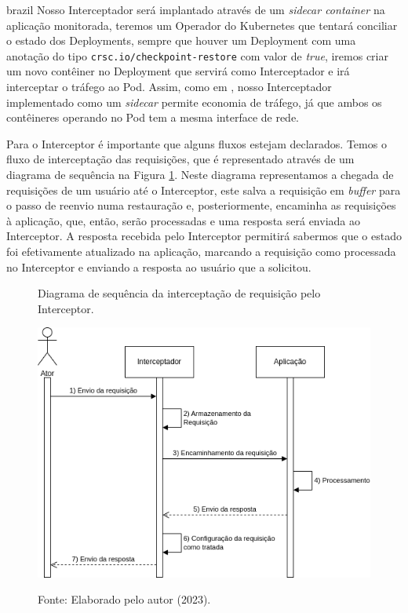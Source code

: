 \begin{otherlanguage*}{brazil}
Nosso Interceptador será implantado através de um \textit{sidecar container} na aplicação
monitorada, teremos um Operador do Kubernetes que tentará conciliar o estado dos Deployments,
sempre que houver um Deployment com uma anotação do tipo \texttt{crsc.io/checkpoint-restore}
com valor de \textit{true}, iremos criar um novo contêiner no Deployment que servirá como 
Interceptador e irá interceptar o tráfego ao Pod. Assim, como em \cite{muller2022architecture},
nosso Interceptador implementado como um \textit{sidecar} permite economia de tráfego, já que
ambos os contêineres operando no Pod tem a mesma interface de rede.

Para o Interceptor é importante que alguns fluxos estejam declarados. Temos o fluxo de
interceptação das requisições, que é representado através de um diagrama de sequência na
Figura \ref{fig:interceptor-request-interception}. Neste diagrama representamos a chegada
de requisições de um usuário até o Interceptor, este salva a requisição em \textit{buffer} para
o passo de reenvio numa restauração e, posteriormente, encaminha as requisições à aplicação,
que, então, serão processadas e uma resposta será enviada ao Interceptor. A resposta
recebida pelo Interceptor permitirá sabermos que o estado foi efetivamente atualizado
na aplicação, marcando a requisição como processada no Interceptor e enviando a resposta ao
usuário que a solicitou.

\begin{figure}[h]
\centering
\caption{Diagrama de sequência da interceptação de requisição pelo Interceptor.}
\includegraphics[scale=0.72]{images/interceptor-intercept.png}
\label{fig:interceptor-request-interception}
\caption*{Fonte: Elaborado pelo autor (2023).}
\end{figure}


\end{otherlanguage*}
